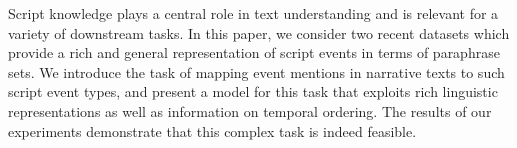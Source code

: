 Script knowledge plays a central role in text understanding and is relevant for a variety of downstream tasks. In this paper, we consider two recent datasets which provide a rich and general representation of script events in terms of paraphrase sets. We introduce the task of mapping event mentions in narrative texts to such script event types, and present a model for this task that exploits rich linguistic representations as well as information on temporal ordering. The results of our experiments demonstrate that this complex task is indeed feasible.
